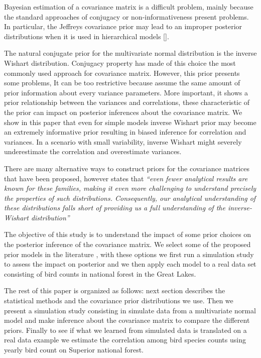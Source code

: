 \documentclass[a4paper]{article}
\begin{document}
Bayesian estimation of a covariance matrix is a difficult problem, mainly because the standard approaches of conjugacy or non-informativeness present problems. In particular, the  Jeffreys covariance prior may lead to an improper posterior distributions when it is used in hierarchical models \ref{}.  

The natural conjugate prior for the multivariate normal distribution is the inverse Wishart distribution. Conjugacy property has made of this choice the most commonly used approach for covariance matrix. However, this prior presents some problems, It can be too restrictive because assume the same amount of prior information about every variance parameters. More important, it shows a prior relationship between the variances and correlations, these characteristic of the prior can impact on posterior inferences about the covariance matrix. We show in this paper that even for simple models inverse Wishart prior may become an extremely informative prior resulting in biased inference for correlation and variances. In a scenario with small variability, inverse Wishart might severely underestimate the correlation and overestimate variances. 

There are many alternative ways to construct priors for the covariance matrices that have been proposed,  however \cite{visualize} states that 
 \textit{``even fewer analytical results are known for these families, making it even more challenging to understand precisely the properties of such distributions. Consequently, our analytical understanding of these distributions falls short of providing us a full understanding of the inverse-Wishart distribution'' }
 
The objective of this study is to understand the impact of some prior choices on the posterior inference of the covariance matrix. We select some of the proposed prior models in the literature , with these options we first run a simulation study to assess the impact on posterior and we then apply each model  to a real data set consisting of bird counts in national forest in the Great Lakes. 

The rest of this paper is organized as follows: next section describes the statistical methods and the covariance prior distributions we use. Then we present a simulation study consisting in simulate data from a multivariate normal model and make inference about the covariance matrix to compare the different priors. Finally to see if what we learned from simulated data is translated on a real data example we estimate the correlation among bird species counts using yearly bird count on Superior national forest. 
\end{document}

